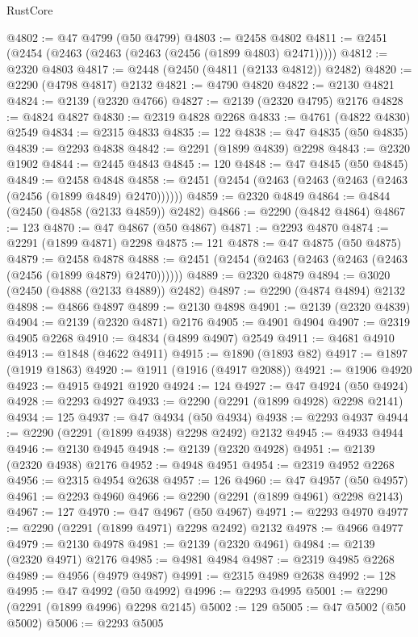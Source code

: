 \begin{lexlean}{RustCore}
\begin{coremodule}
@4802 := @47 @4799 (@50 @4799)
@4803 := @2458 @4802
@4811 := @2451 (@2454 (@2463 (@2463 (@2463 (@2456 (@1899 @4803) @2471)))))
@4812 := @2320 @4803
@4817 := @2448 (@2450 (@4811 (@2133 @4812)) @2482)
@4820 := @2290 (@4798 @4817) @2132
@4821 := @4790 @4820
@4822 := @2130 @4821
@4824 := @2139 (@2320 @4766)
@4827 := @2139 (@2320 @4795) @2176
@4828 := @4824 @4827
@4830 := @2319 @4828 @2268
@4833 := @4761 (@4822 @4830) @2549
@4834 := @2315 @4833
@4835 := 122
@4838 := @47 @4835 (@50 @4835)
@4839 := @2293 @4838
@4842 := @2291 (@1899 @4839) @2298
@4843 := @2320 @1902
@4844 := @2445 @4843
@4845 := 120
@4848 := @47 @4845 (@50 @4845)
@4849 := @2458 @4848
@4858 := @2451 (@2454 (@2463 (@2463 (@2463 (@2463 (@2456 (@1899 @4849) @2470))))))
@4859 := @2320 @4849
@4864 := @4844 (@2450 (@4858 (@2133 @4859)) @2482)
@4866 := @2290 (@4842 @4864)
@4867 := 123
@4870 := @47 @4867 (@50 @4867)
@4871 := @2293 @4870
@4874 := @2291 (@1899 @4871) @2298
@4875 := 121
@4878 := @47 @4875 (@50 @4875)
@4879 := @2458 @4878
@4888 := @2451 (@2454 (@2463 (@2463 (@2463 (@2463 (@2456 (@1899 @4879) @2470))))))
@4889 := @2320 @4879
@4894 := @3020 (@2450 (@4888 (@2133 @4889)) @2482)
@4897 := @2290 (@4874 @4894) @2132
@4898 := @4866 @4897
@4899 := @2130 @4898
@4901 := @2139 (@2320 @4839)
@4904 := @2139 (@2320 @4871) @2176
@4905 := @4901 @4904
@4907 := @2319 @4905 @2268
@4910 := @4834 (@4899 @4907) @2549
@4911 := @4681 @4910
@4913 := @1848 (@4622 @4911)
@4915 := @1890 (@1893 @82)
@4917 := @1897 (@1919 @1863)
@4920 := @1911 (@1916 (@4917 @2088))
@4921 := @1906 @4920
@4923 := @4915 @4921 @1920
@4924 := 124
@4927 := @47 @4924 (@50 @4924)
@4928 := @2293 @4927
@4933 := @2290 (@2291 (@1899 @4928) @2298 @2141)
@4934 := 125
@4937 := @47 @4934 (@50 @4934)
@4938 := @2293 @4937
@4944 := @2290 (@2291 (@1899 @4938) @2298 @2492) @2132
@4945 := @4933 @4944
@4946 := @2130 @4945
@4948 := @2139 (@2320 @4928)
@4951 := @2139 (@2320 @4938) @2176
@4952 := @4948 @4951
@4954 := @2319 @4952 @2268
@4956 := @2315 @4954 @2638
@4957 := 126
@4960 := @47 @4957 (@50 @4957)
@4961 := @2293 @4960
@4966 := @2290 (@2291 (@1899 @4961) @2298 @2143)
@4967 := 127
@4970 := @47 @4967 (@50 @4967)
@4971 := @2293 @4970
@4977 := @2290 (@2291 (@1899 @4971) @2298 @2492) @2132
@4978 := @4966 @4977
@4979 := @2130 @4978
@4981 := @2139 (@2320 @4961)
@4984 := @2139 (@2320 @4971) @2176
@4985 := @4981 @4984
@4987 := @2319 @4985 @2268
@4989 := @4956 (@4979 @4987)
@4991 := @2315 @4989 @2638
@4992 := 128
@4995 := @47 @4992 (@50 @4992)
@4996 := @2293 @4995
@5001 := @2290 (@2291 (@1899 @4996) @2298 @2145)
@5002 := 129
@5005 := @47 @5002 (@50 @5002)
@5006 := @2293 @5005

\end{coremodule}
\end{lexlean}
